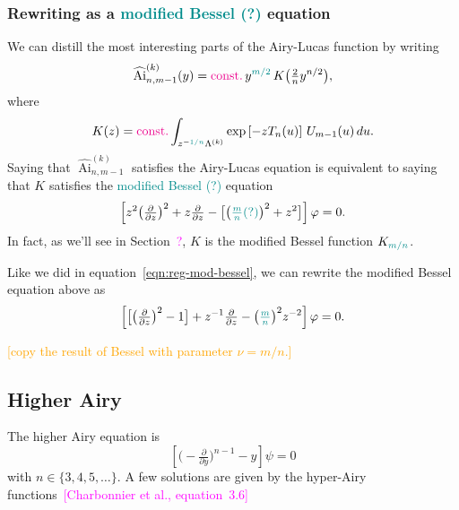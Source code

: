 \documentclass{article}
\DeclareMathOperator{\Ai}{Ai}
\begin{document}
\subsubsection{Rewriting as a \textcolor{DarkCyan}{modified Bessel (?)} equation}
We can distill the most interesting parts of the Airy-Lucas function by writing
\[ \widehat{\Ai}^{(k)}_{n, m-1}(y) = \textcolor{magenta}{\text{const.}}\,y^{\textcolor{DarkCyan}{m/2}}\,K\big(\tfrac{2}{n} y^{n/2}\big), \]
where
\begin{equation}\label{integral:mod-bessel-rational}
K(z) = \textcolor{magenta}{\text{const.}} \int_{z^{-\textcolor{DarkCyan}{1/n}}\Lambda^{(k)}} \exp\left[-z T_n(u)\right]\,U_{m-1}(u)\,du.
\end{equation}
Saying that $\widehat{\Ai}^{(k)}_{n, m-1}$ satisfies the Airy-Lucas equation is equivalent to saying that $K$ satisfies the \textcolor{DarkCyan}{modified Bessel (?)} equation
\begin{equation}%
\left[z^2 \big(\tfrac{\partial}{\partial z}\big)^2 + z \tfrac{\partial}{\partial z} - \big[\big(\textcolor{DarkCyan}{\tfrac{m}{n} (?)}\big)^2 + z^2\big]\right] \varphi = 0.
\end{equation}
In fact, as we'll see in Section~\textcolor{magenta}{?}, $K$ is the modified Bessel function $K_{\textcolor{DarkCyan}{m/n}}$.

Like we did in equation~\ref{eqn:reg-mod-bessel}, we can rewrite the modified Bessel equation above as
\begin{equation}%
\left[ \big[ \big(\tfrac{\partial}{\partial z}\big)^2 - 1 \big] + z^{-1} \tfrac{\partial}{\partial z} - \big(\textcolor{DarkCyan}{\tfrac{m}{n}}\big)^2 z^{-2} \right] \varphi = 0.
\end{equation}

\textcolor{orange}{[copy the result of Bessel with parameter $\nu=m/n$.]}

\subsection{Higher Airy}

The higher Airy equation is
\begin{equation}\label{eqn:airy-lucas}
\left[\big({-}\tfrac{\partial}{\partial y}\big)^{n-1} - y\right] \psi = 0
\end{equation}
with $n \in \{3, 4, 5, \ldots\}$. A few solutions are given by the hyper-Airy functions~\textcolor{magenta}{[Charbonnier et al., equation~3.6]}
\end{document}
